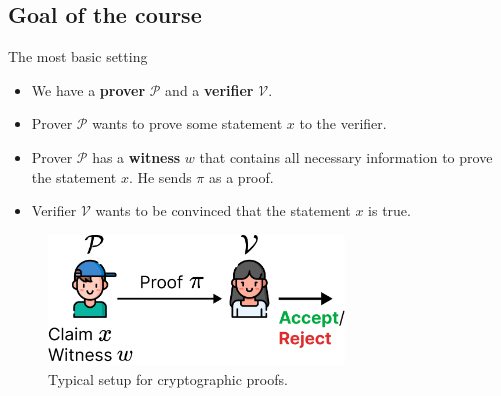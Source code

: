 \documentclass[xcolor={usenames,dvipsnames}]{beamer}
\begin{document}
    \subsection{Goal of the course}
    \begin{frame}{The most basic setting}
        \begin{itemize}
            \item We have a \textbf{prover} $\mathcal{P}$ and a \textbf{verifier} $\mathcal{V}$.
            \item Prover $\mathcal{P}$ wants to prove some statement $x$ to the verifier.
            \item Prover $\mathcal{P}$ has a \textbf{witness} $w$ that contains all necessary information to prove the statement $x$. He sends $\pi$ as a proof.
            \item Verifier $\mathcal{V}$ wants to be convinced that the statement $x$ is true.
        \end{itemize}

        \begin{figure}
            \centering
            \includegraphics[width=0.7\textwidth]{images/lecture_6/setup.pdf}
            \caption{Typical setup for cryptographic proofs.}
        \end{figure}
    \end{frame}
\end{document}
